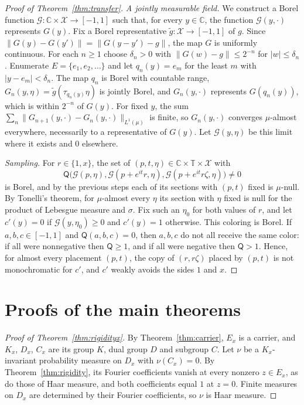 \documentclass[10pt]{article}
\theoremstyle{remark}
\newcommand{\C}{\mathbb C}
\newcommand{\T}{\mathbb T}
\begin{document}
\begin{proof}[Proof of Theorem~\ref{thm:transfer}]
\emph{A jointly measurable field.} We construct a Borel function $\mathcal G\colon\C\times\mathcal X\to[-1,1]$ such that, for every $y\in\C$, the function $\mathcal G(y,\cdot)$ represents $G(y)$. Fix a Borel representative $\tilde g\colon\mathcal X\to[-1,1]$ of $g$. Since $\|G(y)-G(y')\|=\|G(y-y')-g\|$, the map $G$ is uniformly continuous. For each $n\ge1$ choose $\delta_n>0$ with $\|G(w)-g\|\le2^{-n}$ for $|w|\le\delta_n$. Enumerate $E=\{e_1,e_2,\ldots\}$ and let $q_n(y)=e_m$ for the least $m$ with $|y-e_m|<\delta_n$. The map $q_n$ is Borel with countable range, $G_n(y,\eta)=\tilde g(\tau_{q_n(y)}\eta)$ is jointly Borel, and $G_n(y,\cdot)$ represents $G(q_n(y))$, which is within $2^{-n}$ of $G(y)$. For fixed $y$, the sum $\sum_n\|G_{n+1}(y,\cdot)-G_n(y,\cdot)\|_{L^1(\mu)}$ is finite, so $G_n(y,\cdot)$ converges $\mu$-almost everywhere, necessarily to a representative of $G(y)$. Let $\mathcal G(y,\eta)$ be this limit where it exists and $0$ elsewhere.

\emph{Sampling.} For $r\in\{1,x\}$, the set of $(p,t,\eta)\in\C\times\T\times\mathcal X$ with
\[
 \mathsf Q\bigl(\mathcal G(p,\eta),\mathcal G(p+e^{it}r,\eta),\mathcal G(p+e^{it}r\zeta,\eta)\bigr)\ne0
\]
is Borel, and by the previous steps each of its sections with $(p,t)$ fixed is $\mu$-null. By Tonelli's theorem, for $\mu$-almost every $\eta$ its section with $\eta$ fixed is null for the product of Lebesgue measure and $\sigma$. Fix such an $\eta_0$ for both values of $r$, and let $c'(y)=0$ if $\mathcal G(y,\eta_0)\ge0$ and $c'(y)=1$ otherwise. This coloring is Borel. If $a,b,c\in[-1,1]$ and $\mathsf Q(a,b,c)=0$, then $a,b,c$ do not all receive the same color: if all were nonnegative then $\mathsf Q\ge1$, and if all were negative then $\mathsf Q>1$. Hence, for almost every placement $(p,t)$, the copy of $(r,r\zeta)$ placed by $(p,t)$ is not monochromatic for $c'$, and $c'$ weakly avoids the sides $1$ and $x$.
\end{proof}

\section{Proofs of the main theorems}\label{sec:proof}

\begin{proof}[Proof of Theorem~\ref{thm:rigidityx}]
By Theorem~\ref{thm:carrier}, $E_x$ is a carrier, and $K_x$, $D_x$, $C_x$ are its group $K$, dual group $D$ and subgroup $C$. Let $\nu$ be a $K_x$-invariant probability measure on $D_x$ with $\nu(C_x)=0$. By Theorem~\ref{thm:rigidity}, its Fourier coefficients vanish at every nonzero $z\in E_x$, as do those of Haar measure, and both coefficients equal $1$ at $z=0$. Finite measures on $D_x$ are determined by their Fourier coefficients, so $\nu$ is Haar measure.
\end{proof}
\end{document}
